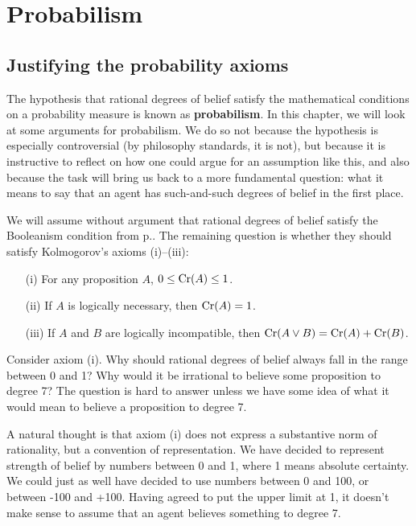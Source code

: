 \chapter{Probabilism}\label{ch:probabilism}

\section{Justifying the probability axioms}

The hypothesis that rational degrees of belief satisfy the mathematical
conditions on a probability measure is known as \textbf{probabilism}. In this
chapter, we will look at some arguments for probabilism. We do so not because
the hypothesis is especially controversial (by philosophy standards, it is not),
but because it is instructive to reflect on how one could argue for an
assumption like this, and also because the task will bring us back to a more
fundamental question: what it means to say that an agent has such-and-such
degrees of belief in the first place.

We will assume without argument that rational degrees of belief satisfy the
Boo\-lean\-ism condition from p.\pageref{p:booleanism}. The remaining question
is whether they should satisfy Kolmogorov's axioms (i)--(iii):
\begin{itemize}
  \itemsep0em 
  \item[(i)] For any proposition $A$, $0 \leq \text{Cr}(A) \leq 1$.
  \item[(ii)] If $A$ is logically necessary, then $\text{Cr}(A) = 1$.
  \item[(iii)] If $A$ and $B$ are logically incompatible, then $\text{Cr}(A \lor B) = \text{Cr}(A) + \text{Cr}(B)$.
\end{itemize}

Consider axiom (i). Why should rational degrees of belief always fall in the
range between 0 and 1? Why would it be irrational to believe some proposition to
degree 7? The question is hard to answer unless we have some idea of what it
would mean to believe a proposition to degree 7.

A natural thought is that axiom (i) does not express a substantive norm of
rationality, but a convention of representation. We have decided to represent
strength of belief by numbers between 0 and 1, where 1 means absolute certainty.
We could just as well have decided to use numbers between 0 and 100, or between
-100 and +100. Having agreed to put the upper limit at 1, it
doesn't make sense to assume that an agent believes something to degree 7.

